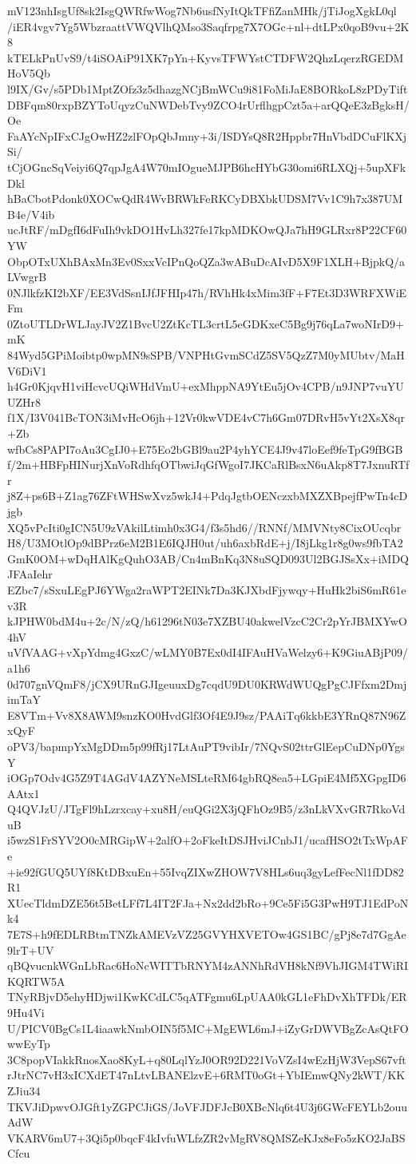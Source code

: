 mV123nhIsgUf8sk2IsgQWRfwWog7Nb6usfNyItQkTFfiZanMHk/jTiJogXgkL0ql
/iER4vgv7Yg5WbzraattVWQVlhQMso3Saqfrpg7X7OGc+nl+dtLPx0qoB9vu+2K8
kTELkPnUvS9/t4iSOAiP91XK7pYn+KyvsTFWYstCTDFW2QhzLqerzRGEDMHoV5Qb
l9IX/Gv/s5PDb1MptZOfz3z5dhazgNCjBmWCu9i81FoMiJaE8BORkoL8zPDyTift
DBFqm80rxpBZYToUqyzCuNWDebTvy9ZCO4rUrflhgpCzt5a+arQQeE3zBgksH/Oe
FaAYcNpIFxCJgOwHZ2zlFOpQbJmny+3i/ISDYsQ8R2Hppbr7HnVbdDCuFlKXjSi/
tCjOGncSqVeiyi6Q7qpJgA4W70mIOgueMJPB6hcHYbG30omi6RLXQj+5upXFkDkl
hBaCbotPdonk0XOCwQdR4WvBRWkFeRKCyDBXbkUDSM7Vv1C9h7x387UMB4e/V4ib
ucJtRF/mDgfI6dFuIh9vkDO1HvLh327fe17kpMDKOwQJa7hH9GLRxr8P22CF60YW
ObpOTxUXhBAxMn3Ev0SxxVcIPnQoQZa3wABuDcAIvD5X9F1XLH+BjpkQ/aLVwgrB
0NJlkfzKI2bXF/EE3VdSsnIJfJFHIp47h/RVhHk4xMim3fF+F7Et3D3WRFXWiEFm
0ZtoUTLDrWLJayJV2Z1BvcU2ZtKcTL3crtL5eGDKxeC5Bg9j76qLa7woNIrD9+mK
84Wyd5GPiMoibtp0wpMN9sSPB/VNPHtGvmSCdZ5SV5QzZ7M0yMUbtv/MaHV6DiV1
h4Gr0KjqvH1viHcvcUQiWHdVmU+exMhppNA9YtEu5jOv4CPB/n9JNP7vuYUUZHr8
f1X/I3V041BcTON3iMvHcO6jh+12Vr0kwVDE4vC7h6Gm07DRvH5vYt2XsX8qr+Zb
wfbCs8PAPI7oAu3CgIJ0+E75Eo2bGBl9au2P4yhYCE4J9v47loEef9feTpG9fBGB
f/2m+HBFpHINurjXnVoRdhfqOTbwiJqGfWgoI7JKCaRlBsxN6uAkp8T7JxnuRTfr
j8Z+ps6B+Z1ag76ZFtWHSwXvz5wkJ4+PdqJgtbOENczxbMXZXBpejfPwTn4cDjgb
XQ5vPcIti0gICN5U9zVAkilLtimh0x3G4/f3s5hd6//RNNf/MMVNty8CixOUcqbr
H8/U3MOtlOp9dBPrz6eM2B1E6IQJH0ut/uh6axbRdE+j/I8jLkg1r8g0ws9fbTA2
GmK0OM+wDqHAlKgQuhO3AB/Cn4mBnKq3N8uSQD093Ul2BGJSsXx+iMDQJFAaIehr
EZbc7/sSxuLEgPJ6YWga2raWPT2EINk7Da3KJXbdFjywqy+HuHk2biS6mR61ev3R
kJPHW0bdM4u+2c/N/zQ/h61296tN03e7XZBU40akwelVzcC2Cr2pYrJBMXYwO4hV
uVfVAAG+vXpYdmg4GxzC/wLMY0B7Ex0dI4IFAuHVaWelzy6+K9GiuABjP09/a1h6
0d707gnVQmF8/jCX9URnGJIgeuuxDg7cqdU9DU0KRWdWUQgPgCJFfxm2DmjimTaY
E8VTm+Vv8X8AWM9snzKO0HvdGlf3Of4E9J9sz/PAAiTq6kkbE3YRnQ87N96ZxQyF
oPV3/bapmpYxMgDDm5p99fRj17LtAuPT9vibIr/7NQvS02ttrGlEepCuDNp0YgsY
iOGp7Odv4G5Z9T4AGdV4AZYNeMSLteRM64gbRQ8ea5+LGpiE4Mf5XGpgID6AAtx1
Q4QVJzU/JTgFl9hLzrxcay+xu8H/euQGi2X3jQFhOz9B5/z3nLkVXvGR7RkoVduB
i5wzS1FrSYV2O0cMRGipW+2alfO+2oFkeItDSJHviJCnbJ1/ucafHSO2tTxWpAFe
+ie92fGUQ5UYf8KtDBxuEn+55IvqZIXwZHOW7V8HLs6uq3gyLefFecNl1fDD82R1
XUecTldmDZE56t5BetLFf7L4IT2FJa+Nx2dd2bRo+9Ce5Fi5G3PwH9TJ1EdPoNk4
7E7S+h9fEDLRBtmTNZkAMEVzVZ25GVYHXVETOw4GS1BC/gPj8e7d7GgAe9lrT+UV
qBQvucnkWGnLbRac6HoNcWITTbRNYM4zANNhRdVH8kNf9VhJIGM4TWiRIKQRTW5A
TNyRBjvD5ehyHDjwi1KwKCdLC5qATFgmu6LpUAA0kGL1eFhDvXhTFDk/ER9Hu4Vi
U/PICV0BgCs1L4iaawkNmbOIN5f5MC+MgEWL6mJ+iZyGrDWVBgZcAsQtFOwwEyTp
3C8popVIakkRnosXao8KyL+q80LqlYzJ0OR92D221VoVZsI4wEzHjW3VepS67vft
rJtrNC7vH3xICXdET47nLtvLBANElzvE+6RMT0oGt+YbIEmwQNy2kWT/KKZJiu34
TKVJiDpwvOJGft1yZGPCJiGS/JoVFJDFJcB0XBcNlq6t4U3j6GWcFEYLb2ouuAdW
VKARV6mU7+3Qi5p0bqcF4kIvfuWLfzZR2vMgRV8QMSZeKJx8eFo5zKO2JaBSCfcu
